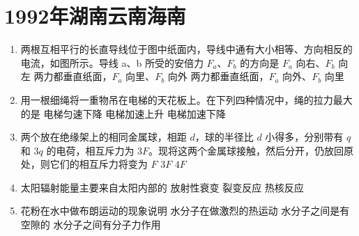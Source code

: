 \documentclass[\gkver]{gaokaozhenti}
\begin{document}
\chapter{1992年湖南云南海南}

\begin{enumerate}
\item
两根互相平行的长直导线位于图中纸面内，导线中通有大小相等、方向相反的电流，如图所示。导线 a、b 所受的安倍力 $F_{a}$、$F_{b}$ 的方向是
{$F_{a}$ 向右、$F_{b}$ 向左}
{两力都垂直纸面，$F_{a}$ 向里、$F_{b}$ 向外}
{两力都垂直纸面，$F_{a}$ 向外、$F_{b}$ 向里}

\item
用一根细绳将一重物吊在电梯的天花板上。在下列四种情况中，绳的拉力最大的是
{电梯匀速下降}
{电梯加速上升}
{电梯加速下降}

\item
两个放在绝缘架上的相同金属球，相距 $d$，球的半径比 $d$ 小得多，分别带有 $q$ 和 $3q$ 的电荷，相互斥力为 $3F$。现将这两个金属球接触，然后分开，仍放回原处，则它们的相互斥力将变为
{$F$}
{$3F$}
{$4F$}

\item
太阳辐射能量主要来自太阳内部的
{放射性衰变}
{裂变反应}
{热核反应}

\item
花粉在水中做布朗运动的现象说明
{水分子在做激烈的热运动}
{水分子之间是有空隙的}
{水分子之间有分子力作用}


\end{enumerate}
\end{document}
